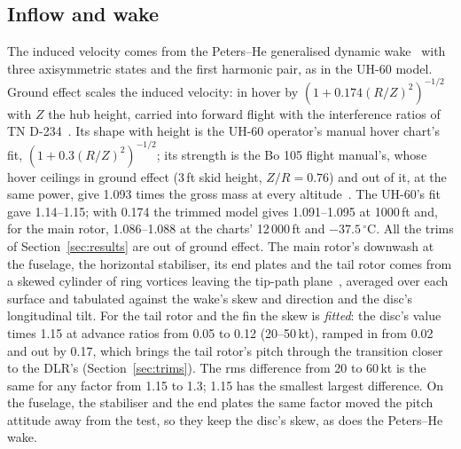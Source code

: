 \documentclass[10pt,a4paper,twocolumn]{article}
\begin{document}
\subsection{Inflow and wake}
The induced velocity comes from the Peters--He generalised dynamic wake~\cite{metu} with three axisymmetric states and the first harmonic
pair, as in the UH-60 model. Ground effect scales the induced velocity: in hover by $(1+0.174(R/Z)^2)^{-1/2}$ with $Z$ the hub height,
carried into forward flight with the interference ratios of TN D-234~\cite{heyson}. Its shape with height is the UH-60 operator's manual hover
chart's fit, $(1+0.3(R/Z)^2)^{-1/2}$; its strength is the Bo 105 flight manual's, whose hover ceilings in ground effect (3\,ft skid height,
$Z/R=0.76$) and out of it, at the same power, give 1.093 times the gross mass at every altitude~\cite{fm}. The UH-60's fit gave 1.14--1.15;
with 0.174 the trimmed model gives 1.091--1.095 at 1000\,ft and, for the main rotor, 1.086--1.088 at the charts' 12\,000\,ft and
$-37.5\,^\circ$C. All the trims of Section~\ref{sec:results} are out of ground effect. The main rotor's downwash at the fuselage, the horizontal stabiliser, its end plates and the tail rotor comes from a
skewed cylinder of ring vortices leaving the tip-path plane~\cite{hk}, averaged over each surface and tabulated against the wake's skew and
direction and the disc's longitudinal tilt. For the tail rotor and the fin the skew is \emph{fitted}: the disc's value times 1.15 at advance
ratios from 0.05 to 0.12 (20--50\,kt), ramped in from 0.02 and out by 0.17, which brings the tail rotor's pitch through the transition closer to
the DLR's (Section~\ref{sec:trims}). The rms difference from 20 to 60\,kt is the same for any factor from 1.15 to 1.3; 1.15 has the smallest
largest difference. On the fuselage, the stabiliser and the end plates the same factor moved the pitch attitude away from the test, so they
keep the disc's skew, as does the Peters--He wake.
\end{document}
